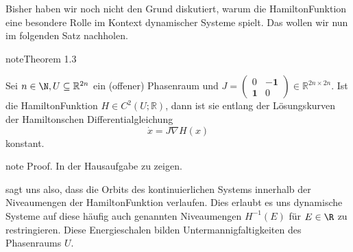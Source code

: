 \documentclass[letterpaper,10pt,english]{jupyterBook}
\begin{document}
\sphinxAtStartPar
Bisher haben wir noch nicht den Grund diskutiert, warum die Hamilton\sphinxhyphen{}Funktion eine besondere Rolle im Kontext dynamischer Systeme spielt.
Das wollen wir nun im folgenden Satz nachholen.
\label{ode/hamilton:thm:hamconst}
\begin{sphinxadmonition}{note}{Theorem 1.3}



\sphinxAtStartPar
Sei \(n\in \N, U \subseteq \mathbb{R}^{2n}\) ein (offener) Phasenraum und \(J= \begin{pmatrix} 0 & - \mathbf{1} \\ \mathbf{1} & 0 \end{pmatrix} \in \mathbb{R}^{2n \times 2n}\).
Ist die Hamilton\sphinxhyphen{}Funktion \(H \in C^2(U; \mathbb{R})\), dann ist sie entlang der Lösungskurven der Hamiltonschen Differentialgleichung
\begin{equation*}
\dot x = J \nabla H(x)
\end{equation*}
\sphinxAtStartPar
konstant.
\end{sphinxadmonition}

\begin{sphinxadmonition}{note}
\sphinxAtStartPar
Proof. In der Hausaufgabe zu zeigen.
\end{sphinxadmonition}

\sphinxAtStartPar
{\hyperref[\detokenize{ode/hamilton:thm:hamconst}]{}} sagt uns also, dass die Orbits des kontinuierlichen Systems innerhalb der Niveaumengen der Hamilton\sphinxhyphen{}Funktion verlaufen.
Dies erlaubt es uns dynamische Systeme auf diese häufig auch  genannten Niveaumengen \(H^{-1}(E)\) für \(E \in \R\) zu restringieren.
Diese Energieschalen bilden Untermannigfaltigkeiten des Phasenraums \(U\).
\end{document}
